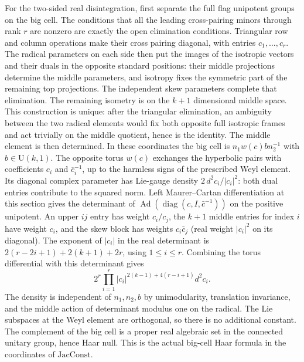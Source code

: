 For the two-sided real disintegration, first separate the
full flag unipotent groups on the big cell. The conditions
that all the leading cross-pairing minors through rank \(r\)
are nonzero are exactly the open elimination conditions.
Triangular row and column operations make their cross
pairing diagonal, with entries \(c_1,\ldots,c_r\).
The radical parameters on each side then put the images
of the isotropic vectors and their duals in the opposite
standard positions: their middle projections determine
the middle parameters, and isotropy fixes the symmetric
part of the remaining top projections. The independent
skew parameters complete that elimination. The remaining
isometry is on the \(k+1\) dimensional middle space.
This construction is unique: after the triangular
elimination, an ambiguity between the two radical
elements would fix both opposite full isotropic frames
and act trivially on the middle quotient, hence is the
identity. The middle element is then determined.
In these coordinates the big cell is
\(n_1 w(c) b n_2^{-1}\) with \(b\in\mathrm U(k,1)\).
The opposite torus \(w(c)\) exchanges the hyperbolic
pairs with coefficients \(c_i\) and \(\overline c_i^{-1}\),
up to the harmless signs of the prescribed Weyl element.
Its diagonal complex parameter has Lie-gauge density
\(2\,d^2c_i/|c_i|^2\): both dual entries contribute to
the squared norm. Left Maurer--Cartan differentiation
at this section gives the determinant of
\(\operatorname{Ad}(\operatorname{diag}(c,I,\bar c^{-1}))\)
on the positive unipotent. An upper \(ij\) entry has
weight \(c_i/c_j\), the \(k+1\) middle entries for index
\(i\) have weight \(c_i\), and the skew block has weights
\(c_i\bar c_j\) (real weight \(|c_i|^2\) on its diagonal).
The exponent of \(|c_i|\) in the real determinant is
\(2(r-2i+1)+2(k+1)+2r\), using \(1\le i\le r\).
Combining the torus differential with this determinant gives
\[
         2^r\prod_{i=1}^r |c_i|^{2(k-1)+4(r-i+1)}d^2c_i.
                                                               \tag{AN12}
\]
The density is independent of \(n_1,n_2,b\) by unimodularity,
translation invariance, and the middle action of determinant
modulus one on the radical. The Lie subspaces at the Weyl
element are orthogonal, so there is no additional constant.
The complement of the big cell is a proper real algebraic
set in the connected unitary group, hence Haar null.
This is the actual big-cell Haar formula in the coordinates
of \(\mathrm{JacConst}\).

